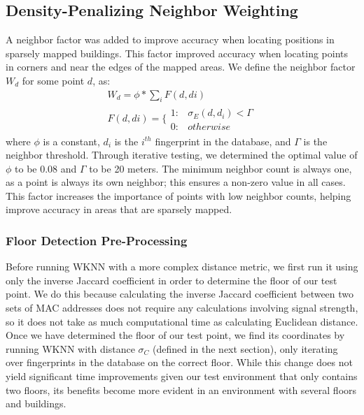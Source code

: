 \documentclass[conference]{IEEEtran}
\begin{document}
\subsection{Density-Penalizing Neighbor Weighting}
\indent A neighbor factor was added to improve accuracy when locating positions in sparsely mapped buildings. This factor improved accuracy when locating points in corners and near the edges of the mapped areas. We define the neighbor factor $W_d$ for some point $d$, as:
\begin{equation}
\label{density}
\begin{split}
W_d=\phi*\sum\limits_{i}F(d,di)\\
F(d,di)=\{\begin{array}{lr}
       1: &  \sigma_E(d, d_i) < \Gamma \\
       0: &  otherwise
\end{array}
\end{split}
\end{equation}
where $\phi$ is a constant, $d_i$ is the $i^{th}$ fingerprint in the database, and $\Gamma$ is the neighbor threshold. Through iterative testing, we determined the optimal value of $\phi$ to be 0.08 and $\Gamma$ to be 20 meters. The minimum neighbor count is always one, as a point is always its own neighbor; this ensures a non-zero value in all cases. This factor increases the importance of points with low neighbor counts, helping improve accuracy in areas that are sparsely mapped. 

\subsubsection*{Floor Detection Pre-Processing}
\indent Before running WKNN with a more complex distance metric, we first run it using only the inverse Jaccard coefficient in order to determine the floor of our test point. We do this because calculating the inverse Jaccard coefficient between two sets of MAC addresses does not require any calculations involving signal strength, so it does not take as much computational time as calculating Euclidean distance. Once we have determined the floor of our test point, we find its coordinates by running WKNN with distance $\sigma_C$ (defined in the next section), only iterating over fingerprints in the database on the correct floor. While this change does not yield significant time improvements given our test environment that only contains two floors, its benefits become more evident in an environment with several floors and buildings.
\end{document}
